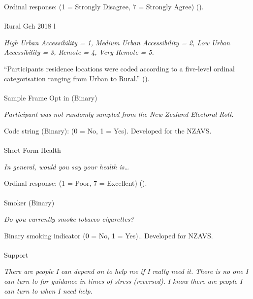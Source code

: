 \documentclass[
  single column]{article}
\makeatletter
\let\oldparagraph\paragraph
\renewcommand{\paragraph}{
    \@ifstar
      \xxxParagraphStar
      \xxxParagraphNoStar
  }
\newcommand{\xxxParagraphStar}[1]{\oldparagraph*{#1}\mbox{}}
\newcommand{\xxxParagraphNoStar}[1]{\oldparagraph{#1}\mbox{}}
\makeatother
\begin{document}
Ordinal response: (1 = Strongly Disagree, 7 = Strongly Agree)
().

\paragraph{Rural Gch 2018 l}\label{rural-gch-2018-l}

\emph{High Urban Accessibility = 1, Medium Urban Accessibility = 2, Low
Urban Accessibility = 3, Remote = 4, Very Remote = 5.}

``Participants residence locations were coded according to a five-level
ordinal categorisation ranging from Urban to Rural.''
().

\paragraph{Sample Frame Opt in
(Binary)}\label{sample-frame-opt-in-binary}

\emph{Participant was not randomly sampled from the New Zealand
Electoral Roll.}

Code string (Binary): (0 = No, 1 = Yes). Developed for the NZAVS.

\paragraph{Short Form Health}\label{short-form-health}

\emph{In general, would you say your health is\ldots{}}

Ordinal response: (1 = Poor, 7 = Excellent)
().

\paragraph{Smoker (Binary)}\label{smoker-binary}

\emph{Do you currently smoke tobacco cigarettes?}

Binary smoking indicator (0 = No, 1 = Yes).. Developed for NZAVS.

\paragraph{Support}\label{support}

\emph{There are people I can depend on to help me if I really need it.}
\emph{There is no one I can turn to for guidance in times of stress
(reversed).} \emph{I know there are people I can turn to when I need
help.}
\end{document}
